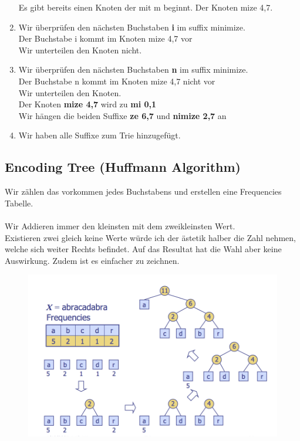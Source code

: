 \documentclass[a4paper,10pt]{report}
\begin{document}
\begin{enumerate}
		Es gibt bereits einen Knoten der mit m beginnt. Der Knoten mize 4,7.
	\item
		Wir überprüfen den nächsten Buchstaben \textbf{i} im suffix minimize.\\
		Der Buchstabe i kommt im Knoten mize 4,7 vor\\
		Wir unterteilen den Knoten nicht.\\
	\item
		Wir überprüfen den nächsten Buchstaben \textbf{n} im suffix minimize.\\
		Der Buchstabe n kommt im Knoten mize 4,7 nicht vor\\
		Wir unterteilen den Knoten.\\
		Der Knoten \textbf{mize 4,7} wird zu \textbf{mi 0,1}\\
		Wir hängen die beiden Suffixe \textbf{ze 6,7} und \textbf{nimize 2,7} an\\
	\item
		Wir haben alle Suffixe zum Trie hinzugefügt.
\end{enumerate}
\newpage
\subsection{Encoding Tree (Huffmann Algorithm)}
	Wir zählen das vorkommen jedes Buchstabens und erstellen eine Frequencies Tabelle.\\
	\\
	Wir Addieren immer den kleinsten mit dem zweikleinsten Wert.\\
	Existieren zwei gleich keine Werte würde ich der ästetik halber die Zahl nehmen, welche sich weiter Rechts befindet. Auf das Resultat hat die Wahl aber keine Auswirkung. Zudem ist es einfacher zu zeichnen.
	\begin{figure}[H]
		\begin{center}
  			\includegraphics[width=\textwidth]{img/Hoffmann.png}
		\end{center}
	\end{figure}
\newpage
\end{document}
